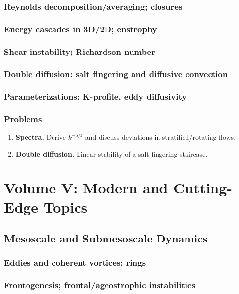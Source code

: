 \documentclass[12pt]{book}
\begin{document}
\section{Reynolds decomposition/averaging; closures}
\section{Energy cascades in 3D/2D; enstrophy}
\section{Shear instability; Richardson number}
\section{Double diffusion: salt fingering and diffusive convection}
\section{Parameterizations: K-profile, eddy diffusivity}
\section*{Problems}
\begin{enumerate}
  \item \textbf{Spectra.} Derive $k^{-5/3}$ and discuss deviations in stratified/rotating flows.
  \item \textbf{Double diffusion.} Linear stability of a salt-fingering staircase.
\end{enumerate}

\part{Volume V: Modern and Cutting-Edge Topics}

\chapter{Mesoscale and Submesoscale Dynamics}
\section{Eddies and coherent vortices; rings}
\section{Frontogenesis; frontal/ageostrophic instabilities}
\end{document}
